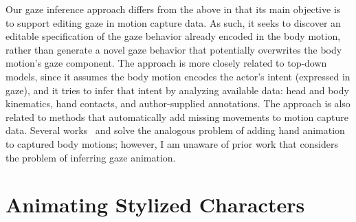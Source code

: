 Our gaze inference approach differs from the above in that its main objective is to support editing gaze in motion capture data. As such, it seeks to discover an editable specification of the gaze behavior already encoded in the body motion, rather than generate a novel gaze behavior that potentially overwrites the body motion's gaze component. The approach is more closely related to top-down models, since it assumes the body motion encodes the actor's intent (expressed in gaze), and it tries to infer that intent by analyzing available data: head and body kinematics, hand contacts, and author-supplied annotations.
The approach is also related to methods that automatically add missing movements to motion capture data. Several works~\citep{jorg2012finger} and \citep{ye2012hand} solve the analogous problem of adding hand animation to captured body motions; however, I am unaware of prior work that considers the problem of inferring gaze animation.

\section{Animating Stylized Characters}
\label{sec:AnimatingStylizedCharacters}

